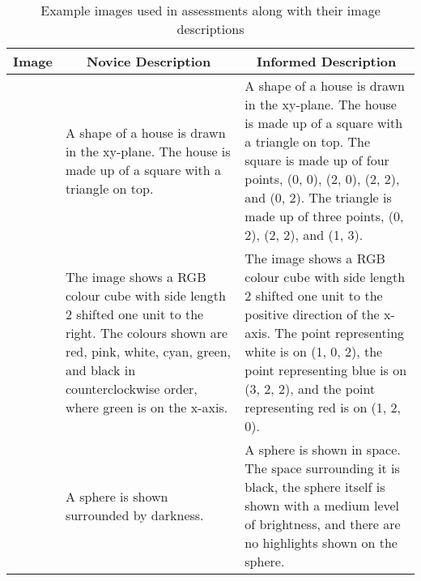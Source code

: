 \documentclass[sigconf,review]{acmart}
\begin{document}
\begin{table*}
    \centering
    \caption{Example images used in assessments along with their image descriptions}
    \label{Images}
    \begin{tabular}{|c|p{5.8cm}|p{5.8cm}|}
        \hline
        \multicolumn{1}{|c|}{Image} & \multicolumn{1}{|c|}{Novice Description} & \multicolumn{1}{|c|}{Informed Description} \\ \hline\hline
        \raisebox{-0.94\totalheight}{\texttt{[image: house.jpg]}} & A shape of a house is drawn in the xy-plane. The house is made up of a square with a triangle on top. & A shape of a house is drawn in the xy-plane. The house is made up of a square with a triangle on top. The square is made up of four points, (0, 0), (2, 0), (2, 2), and (0, 2). The triangle is made up of three points, (0, 2), (2, 2), and (1, 3). \\ \hline
        \raisebox{-0.94\totalheight}{\texttt{[image: cube2.png]}} & The image shows a RGB colour cube with side length 2 shifted one unit to the right. The colours shown are red, pink, white, cyan, green, and black in counterclockwise order, where green is on the x-axis. & The image shows a RGB colour cube with side length 2 shifted one unit to the positive direction of the x-axis. The point representing white is on (1, 0, 2), the point representing blue is on (3, 2, 2), and the point representing red is on (1, 2, 0). \\ \hline
        \raisebox{-0.94\totalheight}{\texttt{[image: light.png]}} & A sphere is shown surrounded by darkness. & A sphere is shown in space. The space surrounding it is black, the sphere itself is shown with a medium level of brightness, and there are no highlights shown on the sphere. \\ \hline
    \end{tabular}
\end{table*}
\end{document}

